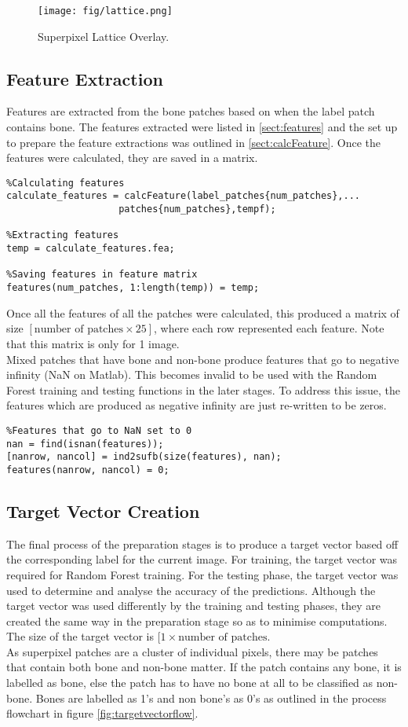 \begin{figure}[H]
\centering
\texttt{[image: fig/lattice.png]}
\caption{Superpixel Lattice Overlay.}
\label{fig: superpixel}
\end{figure}
\subsection{Feature Extraction}
Features are extracted from the bone patches based on when the label patch contains bone. The features extracted were listed in \ref{sect:features} and the set up to prepare the feature extractions was outlined in \ref{sect:calcFeature}. Once the features were calculated, they are saved in a matrix. 
\begin{lstlisting}
%Calculating features
calculate_features = calcFeature(label_patches{num_patches},...
					patches{num_patches},tempf);

%Extracting features
temp = calculate_features.fea;

%Saving features in feature matrix
features(num_patches, 1:length(temp)) = temp;
\end{lstlisting}
\bigskip
Once all the features of all the patches were calculated, this produced a matrix of size $[\textrm{number of patches} \times 25]$, where each row represented each feature. Note that this matrix is only for 1 image. 
\\[1\baselineskip]
Mixed patches that have bone and non-bone produce features that go to negative infinity (NaN on Matlab). This becomes invalid to be used with the Random Forest training and testing functions in the later stages. To address this issue, the features which are produced as negative infinity are just re-written to be zeros. 
\begin{lstlisting}
%Features that go to NaN set to 0
nan = find(isnan(features));
[nanrow, nancol] = ind2sufb(size(features), nan);
features(nanrow, nancol) = 0;
\end{lstlisting}

\subsection{Target Vector Creation}
The final process of the preparation stages is to produce a target vector based off the corresponding label for the current image. For training, the target vector was required for Random Forest training. For the testing phase, the target vector was used to determine and analyse the accuracy of the predictions. Although the target vector was used differently by the training and testing phases, they are created the same way in the preparation stage so as to minimise computations. The size of the target vector is $[1 \times \textrm{number of patches}$. 
\\[1\baselineskip]
As superpixel patches are a cluster of individual pixels, there may be patches that contain both bone and non-bone matter. If the patch contains any bone, it is labelled as bone, else the patch has to have no bone at all to be classified as non-bone. Bones are labelled as 1's and non bone's as 0's as outlined in the process flowchart in figure \ref{fig:targetvectorflow}.

